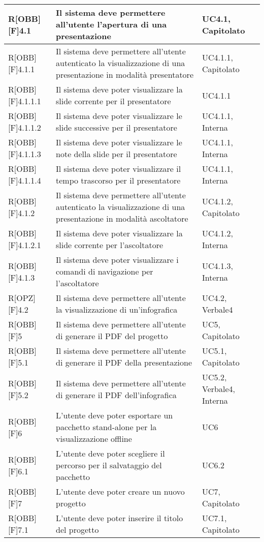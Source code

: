 	\begin{table}[h]
		\begin{tabular}{|p{}|p{}|p{}|}
			\midrule

			R[OBB][F]4.1 & Il sistema deve permettere all'utente l'apertura di una presentazione & UC4.1, Capitolato \\ \midrule
			R[OBB][F]4.1.1 & Il sistema deve permettere all'utente autenticato la visualizzazione di una presentazione in modalità presentatore & UC4.1.1, Capitolato \\ \midrule
			R[OBB][F]4.1.1.1 & Il sistema deve poter visualizzare la slide corrente per il presentatore & UC4.1.1 \\ \midrule
			R[OBB][F]4.1.1.2 & Il sistema deve poter visualizzare le slide successive per il presentatore & UC4.1.1, Interna \\ \midrule
			R[OBB][F]4.1.1.3 & Il sistema deve poter visualizzare le note della slide per il presentatore & UC4.1.1, Interna \\ \midrule
			R[OBB][F]4.1.1.4 & Il sistema deve poter visualizzare il tempo trascorso per il presentatore & UC4.1.1, Interna \\ \midrule
			R[OBB][F]4.1.2 & Il sistema deve permettere all'utente autenticato la visualizzazione di una presentazione in modalità ascoltatore & UC4.1.2, Capitolato \\ \midrule
			R[OBB][F]4.1.2.1 & Il sistema deve poter visualizzare la slide corrente per l'ascoltatore & UC4.1.2, Interna \\ \midrule
			R[OBB][F]4.1.3 & Il sistema deve poter visualizzare i comandi di navigazione per l'ascoltatore & UC4.1.3, Interna \\ \midrule
			R[OPZ][F]4.2 & Il sistema deve permettere all'utente la visualizzazione di un'\gls{infografica} & UC4.2, Verbale4 \\ \midrule
			R[OBB][F]5 & Il sistema deve permettere all'utente di generare il PDF del progetto & UC5, Capitolato \\ \midrule
			R[OBB][F]5.1 & Il sistema deve permettere all'utente di generare il PDF della presentazione & UC5.1, Capitolato \\ \midrule
			R[OBB][F]5.2 & Il sistema deve permettere all'utente di generare il PDF dell'\gls{infografica} & UC5.2, Verbale4, Interna \\ \midrule
			R[OBB][F]6 & L'utente deve poter esportare un pacchetto stand-alone per la visualizzazione offline & UC6 \\ \midrule
			R[OBB][F]6.1 & L'utente deve poter scegliere il percorso per il salvataggio del pacchetto & UC6.2 \\ \midrule
			R[OBB][F]7 & L'utente deve poter creare un nuovo progetto & UC7, Capitolato \\ \midrule
			R[OBB][F]7.1 & L'utente deve poter inserire il titolo del progetto & UC7.1, Capitolato \\ \midrule

		\end{tabular}
	\end{table}
	\newpage
	
